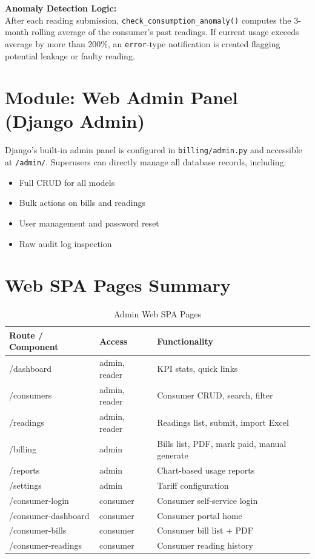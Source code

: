 \documentclass[12pt, a4paper]{report}
\newenvironment{featurelist}{%
    \begin{itemize}[leftmargin=1.5em, itemsep=2pt, parsep=0pt]
}{%
    \end{itemize}
}
\begin{document}
\textbf{Anomaly Detection Logic:}\\
After each reading submission, \texttt{check\_consumption\_anomaly()} computes the 3-month rolling average of the consumer's past readings. If current usage exceeds average by more than 200\%, an \texttt{error}-type notification is created flagging potential leakage or faulty reading.

\section{Module: Web Admin Panel (Django Admin)}

Django's built-in admin panel is configured in \texttt{billing/admin.py} and accessible at \texttt{/admin/}. Superusers can directly manage all database records, including:
\begin{featurelist}
    \item Full CRUD for all models
    \item Bulk actions on bills and readings
    \item User management and password reset
    \item Raw audit log inspection
\end{featurelist}

\section{Web SPA Pages Summary}

\begin{table}[H]
\centering
\caption{Admin Web SPA Pages}
\begin{tabularx}{\textwidth}{>{\ttfamily}l l X}
\toprule
\textbf{Route / Component} & \textbf{Access} & \textbf{Functionality} \\
\midrule
/dashboard & admin, reader & KPI stats, quick links \\
/consumers & admin, reader & Consumer CRUD, search, filter \\
/readings & admin, reader & Readings list, submit, import Excel \\
/billing & admin & Bills list, PDF, mark paid, manual generate \\
/reports & admin & Chart-based usage reports \\
/settings & admin & Tariff configuration \\
/consumer-login & consumer & Consumer self-service login \\
/consumer-dashboard & consumer & Consumer portal home \\
/consumer-bills & consumer & Consumer bill list + PDF \\
/consumer-readings & consumer & Consumer reading history \\
\bottomrule
\end{tabularx}
\end{table}
\end{document}
